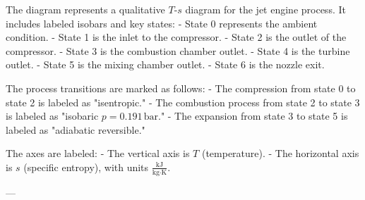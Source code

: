 The diagram represents a qualitative \( T \)-\( s \) diagram for the jet engine process. It includes labeled isobars and key states:  
- State 0 represents the ambient condition.  
- State 1 is the inlet to the compressor.  
- State 2 is the outlet of the compressor.  
- State 3 is the combustion chamber outlet.  
- State 4 is the turbine outlet.  
- State 5 is the mixing chamber outlet.  
- State 6 is the nozzle exit.  

The process transitions are marked as follows:  
- The compression from state 0 to state 2 is labeled as "isentropic."  
- The combustion process from state 2 to state 3 is labeled as "isobaric \( p = 0.191 \, \text{bar} \)."  
- The expansion from state 3 to state 5 is labeled as "adiabatic reversible."  

The axes are labeled:  
- The vertical axis is \( T \) (temperature).  
- The horizontal axis is \( s \) (specific entropy), with units \( \frac{\text{kJ}}{\text{kg·K}} \).  

---